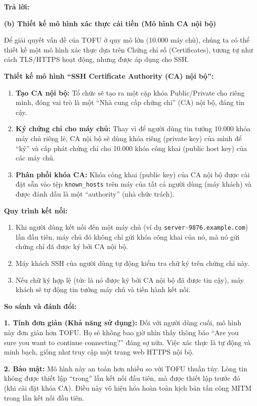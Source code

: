 \begin{center}
    \textbf{Trả lời:}
\end{center}

\textbf{(b) Thiết kế mô hình xác thực cải tiến (Mô hình CA nội bộ)}

Để giải quyết vấn đề của TOFU ở quy mô lớn (10.000 máy chủ), chúng ta có thể thiết kế một mô hình xác thực dựa trên Chứng chỉ số (Certificates), tương tự như cách TLS/HTTPS hoạt động, nhưng được áp dụng cho SSH.

\textbf{Thiết kế mô hình ``SSH Certificate Authority (CA) nội bộ'':}

\begin{enumerate}
    \item \textbf{Tạo CA nội bộ:} Tổ chức sẽ tạo ra một cặp khóa Public/Private cho riêng mình, đóng vai trò là một ``Nhà cung cấp chứng chỉ'' (CA) nội bộ, đáng tin cậy.
    
    \item \textbf{Ký chứng chỉ cho máy chủ:} Thay vì để người dùng tin tưởng 10.000 khóa máy chủ riêng lẻ, CA nội bộ sẽ dùng khóa riêng (private key) của mình để ``ký'' và cấp phát chứng chỉ cho 10.000 khóa công khai (public host key) của các máy chủ.
    
    \item \textbf{Phân phối khóa CA:} Khóa công khai (public key) của CA nội bộ được cài đặt sẵn vào tệp \texttt{known\_hosts} trên máy của tất cả người dùng (máy khách) và được đánh dấu là một ``authority'' (nhà chức trách).
\end{enumerate}

\textbf{Quy trình kết nối:}

\begin{enumerate}
    \item Khi người dùng kết nối đến một máy chủ (ví dụ \texttt{server-9876.example.com}) lần đầu tiên, máy chủ đó không chỉ gửi khóa công khai của nó, mà nó gửi chứng chỉ đã được ký bởi CA nội bộ.
    
    \item Máy khách SSH của người dùng tự động kiểm tra chữ ký trên chứng chỉ này.
    
    \item Nếu chữ ký hợp lệ (tức là nó được ký bởi CA nội bộ đã được tin cậy), máy khách sẽ tự động tin tưởng máy chủ và tiến hành kết nối.
\end{enumerate}

\textbf{So sánh và đánh đổi:}

\textbf{1. Tính đơn giản (Khả năng sử dụng):} Đối với người dùng cuối, mô hình này đơn giản hơn TOFU. Họ sẽ không bao giờ nhìn thấy thông báo ``Are you sure you want to continue connecting?'' đáng sợ nữa. Việc xác thực là tự động và minh bạch, giống như truy cập một trang web HTTPS nội bộ.

\textbf{2. Bảo mật:} Mô hình này an toàn hơn nhiều so với TOFU thuần túy. Lòng tin không được thiết lập ``trong'' lần kết nối đầu tiên, mà được thiết lập trước đó (khi cài đặt khóa CA). Điều này vô hiệu hóa hoàn toàn kịch bản tấn công MITM trong lần kết nối đầu tiên.
